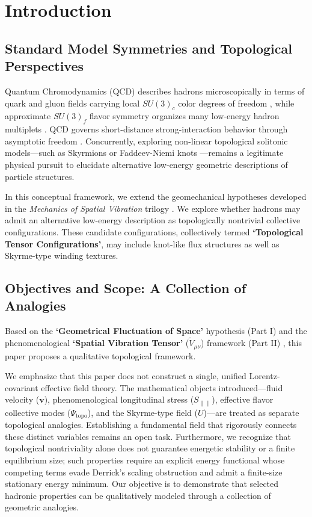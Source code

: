 \documentclass[reprint,amsmath,amssymb,aps,prd]{revtex4-2}
\begin{document}
\maketitle

\section{Introduction}

\subsection{Standard Model Symmetries and Topological Perspectives}
Quantum Chromodynamics (QCD) describes hadrons microscopically in terms of quark and gluon fields carrying local $SU(3)_c$ color degrees of freedom \cite{Workman2022}, while approximate $SU(3)_f$ flavor symmetry organizes many low-energy hadron multiplets \cite{GellMann1964}. QCD governs short-distance strong-interaction behavior through asymptotic freedom \cite{Gross1973}. Concurrently, exploring non-linear topological solitonic models---such as Skyrmions \cite{Skyrme1961, Adkins1983} or Faddeev-Niemi knots \cite{Faddeev1997}---remains a legitimate physical pursuit to elucidate alternative low-energy geometric descriptions of particle structures.

In this conceptual framework, we extend the geomechanical hypotheses developed in the \textit{Mechanics of Spatial Vibration} trilogy \cite{YooPart1, YooPart2, YooPart3}. We explore whether hadrons may admit an alternative low-energy description as topologically nontrivial collective configurations. These candidate configurations, collectively termed \textbf{`Topological Tensor Configurations'}, may include knot-like flux structures as well as Skyrme-type winding textures.

\subsection{Objectives and Scope: A Collection of Analogies}
Based on the \textbf{`Geometrical Fluctuation of Space'} hypothesis (Part I) \cite{YooPart1} and the phenomenological \textbf{`Spatial Vibration Tensor'} ($\tilde{V}_{\mu\nu}$) framework (Part II) \cite{YooPart2}, this paper proposes a qualitative topological framework.

We emphasize that this paper does not construct a single, unified Lorentz-covariant effective field theory. The mathematical objects introduced---fluid velocity ($\mathbf{v}$), phenomenological longitudinal stress ($S_{\parallel\parallel}$), effective flavor collective modes ($\Psi_{\mathrm{topo}}$), and the Skyrme-type field ($U$)---are treated as separate topological analogies. Establishing a fundamental field that rigorously connects these distinct variables remains an open task. Furthermore, we recognize that topological nontriviality alone does not guarantee energetic stability or a finite equilibrium size; such properties require an explicit energy functional whose competing terms evade Derrick's scaling obstruction \cite{Derrick1964} and admit a finite-size stationary energy minimum. Our objective is to demonstrate that selected hadronic properties can be qualitatively modeled through a collection of geometric analogies.
\end{document}
